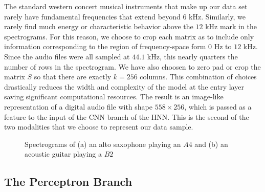 \documentclass[conference,onecolumn,letterpaper]{IEEEtran}
\begin{document}
The standard western concert musical instruments that make up our data set rarely have fundamental frequencies that extend beyond $6$ kHz. Similarly, we rarely find much energy or characteristic behavior above the $12$ kHz mark in the spectrograms. For this reason, we choose to crop each matrix as to include only information corresponding to the region of frequency-space form $0$ Hz to $12$ kHz. Since the audio files were all sampled at $44.1$ kHz, this nearly quarters the number of rows in the spectrogram. We have also choosen to zero pad or crop the matrix $S$ so that there are exactly $k = 256$ columns. This combination of choices drastically reduces the width and complexity of the model at the entry layer saving significant computational resources. The result is an image-like representation of a digital audio file with shape $558 \times 256$, which is passed as a feature to the input of the CNN branch of the HNN. This is the second of the two modalities that we choose to represent our data sample.

\begin{figure}[h]
    \centering
    \caption{Spectrograms of (a) an alto saxophone playing an $A4$ and (b) an acoustic guitar playing a $B2$}
    \label{fig:Example Spectrograms}
\end{figure}


\subsection{The Perceptron Branch}
\label{subsec:MLP}
\end{document}

